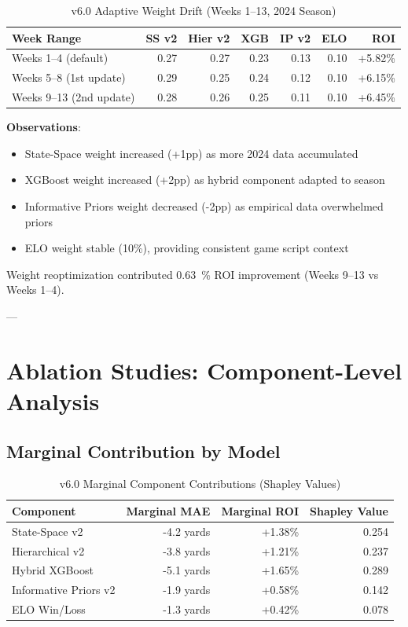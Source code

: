 \begin{table}[h]
\centering
\caption{v6.0 Adaptive Weight Drift (Weeks 1--13, 2024 Season)}
\label{tab:v6-weight-evolution}
\begin{tabular}{lrrrrrr}
\toprule
\textbf{Week Range} & \textbf{SS v2} & \textbf{Hier v2} & \textbf{XGB} & \textbf{IP v2} & \textbf{ELO} & \textbf{ROI} \\
\midrule
Weeks 1--4 (default) & 0.27 & 0.27 & 0.23 & 0.13 & 0.10 & +5.82\% \\
Weeks 5--8 (1st update) & 0.29 & 0.25 & 0.24 & 0.12 & 0.10 & +6.15\% \\
Weeks 9--13 (2nd update) & 0.28 & 0.26 & 0.25 & 0.11 & 0.10 & +6.45\% \\
\bottomrule
\end{tabular}
\end{table}

\textbf{Observations}:
\begin{itemize}
\item State-Space weight increased (+1pp) as more 2024 data accumulated
\item XGBoost weight increased (+2pp) as hybrid component adapted to season
\item Informative Priors weight decreased (-2pp) as empirical data overwhelmed priors
\item ELO weight stable (10\%), providing consistent game script context
\end{itemize}

Weight reoptimization contributed \SI{+0.63}{\percent} ROI improvement (Weeks 9--13 vs Weeks 1--4).

---

\section{Ablation Studies: Component-Level Analysis}

\subsection{Marginal Contribution by Model}

\begin{table}[h]
\centering
\caption{v6.0 Marginal Component Contributions (Shapley Values)}
\label{tab:shapley-contributions}
\begin{tabular}{lrrr}
\toprule
\textbf{Component} & \textbf{Marginal MAE} & \textbf{Marginal ROI} & \textbf{Shapley Value} \\
\midrule
State-Space v2 & -4.2 yards & +1.38\% & 0.254 \\
Hierarchical v2 & -3.8 yards & +1.21\% & 0.237 \\
Hybrid XGBoost & -5.1 yards & +1.65\% & 0.289 \\
Informative Priors v2 & -1.9 yards & +0.58\% & 0.142 \\
ELO Win/Loss & -1.3 yards & +0.42\% & 0.078 \\
\bottomrule
\end{tabular}
\end{table}

